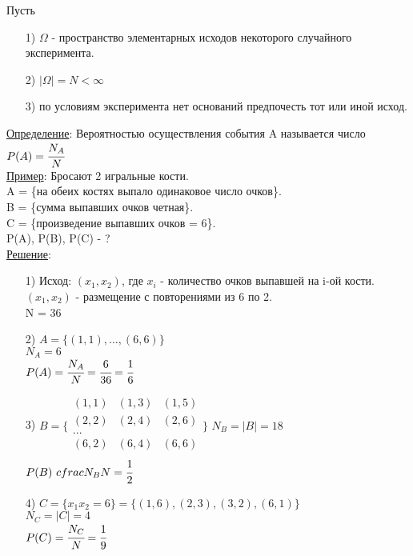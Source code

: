 
Пусть \\
\begin{enumerate}
\item[1)] $\Omega$ - пространство элементарных исходов некоторого случайного эксперимента. \\

\item[2)] $|\Omega| = N < \infty$ \\

\item[3)] по условиям эксперимента нет оснований предпочесть тот или иной исход.
\end{enumerate}

\underline{Определение}: Вероятностью осуществления события A называется число \\
$P(A) = \cfrac{N_A}{N}$ \\


\underline{Пример}: Бросают 2 игральные кости. \\
A = \{на обеих костях выпало одинаковое число очков\}. \\
B = \{сумма выпавших очков четная\}. \\
C = \{произведение выпавших очков = 6\}. \\
P(A), P(B), P(C) - ? \\
\underline{Решение}: 
\begin{enumerate}
\item[1)] Исход: $(x_1, x_2)$, где $x_i$ - количество очков выпавшей на i-ой кости. \\
$(x_1, x_2)$ - размещение с повторениями из 6 по 2. \\
N = 36 \\

\item[2)] $A = \{ (1,1), \ldots , (6,6)\}$ \\
$N_A = 6$ \\
$P(A) = \cfrac{N_A}{N} = \cfrac{6}{36} = \cfrac{1}{6}$ \\

\item[3)] $B = \{
\begin{array}{lll} 
	(1,1) & (1,3) & (1,5) \\
	(2,2) & (2,4) & (2,6) \\
    ... \\
	(6,2) & (6,4) & (6,6) \\
\end{array} \}$
$N_B = |B| = 18$ \\
$P(B) \ cfrac{N_B}{N} = \cfrac{1}{2}$

\item[4)] $C = \{x_1x_2 = 6\} = \{ (1,6), (2,3), (3,2), (6,1)\}$ \\
$N_C = |C| = 4$ \\
$P(C) = \cfrac{N_C}{N} = \cfrac{1}{9}$ \\
\end{enumerate}



